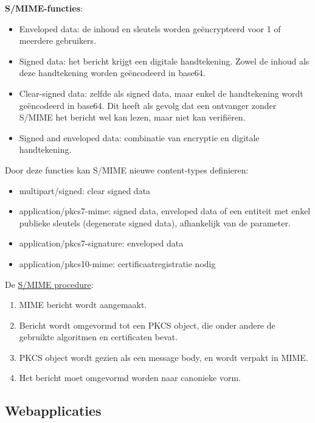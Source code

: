 \documentclass{report}
\begin{document}
	\textbf{S/MIME-functies}:
	\begin{itemize}
		\item[\info] Enveloped data: de inhoud en sleutels worden geëncrypteerd voor 1 of meerdere gebruikers.
		\item[\info] Signed data: het bericht krijgt een digitale handtekening. Zowel de inhoud als deze handtekening worden geëncodeerd in base64.
		\item[\info] Clear-signed data: zelfde als signed data, maar enkel de handtekening wordt geëncodeerd in base64. Dit heeft als gevolg dat een ontvanger zonder S/MIME het bericht wel kan lezen, maar niet kan verifiëren.
		\item[\info] Signed and enveloped data: combinatie van encryptie en digitale handtekening.
	\end{itemize}
	Door deze functies kan S/MIME nieuwe content-types definieren:
	\begin{itemize}
		\item[\info] multipart/signed: clear signed data
		\item[\info] application/pkcs7-mime: signed data, enveloped data of een entiteit met enkel publieke sleutels (degenerate signed data), afhankelijk van de parameter.
		\item[\info] application/pkcs7-signature: enveloped data
		\item[\info] application/pkcs10-mime: certificaatregistratie nodig
	\end{itemize}

	De \underline{S/MIME procedure}:
	\begin{enumerate}
		\item MIME bericht wordt aangemaakt.
		\item Bericht wordt omgevormd tot een PKCS object, die onder andere de gebruikte algoritmen en certificaten bevat.
		\item PKCS object wordt gezien als een message body, en wordt verpakt in MIME.
		\item Het bericht moet omgevormd worden naar canonieke vorm.
	\end{enumerate}

	\subsection{Webapplicaties}
\end{document}
